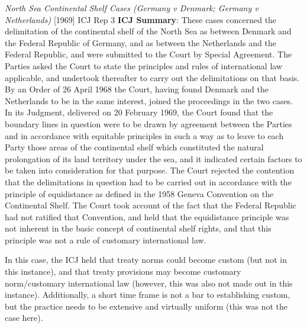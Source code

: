 \begin{casedetails}{\textit{North Sea Continental Shelf Cases (Germany v Denmark; Germany v Netherlands)} [1969] ICJ Rep 3}
    \flushleft
    \textbf{ICJ Summary}: These cases concerned the delimitation of the continental shelf of the North Sea as between Denmark and the Federal Republic of Germany, and as between the Netherlands and the Federal Republic, and were submitted to the Court by Special Agreement. The Parties asked the Court to state the principles and rules of international law applicable, and undertook thereafter to carry out the delimitations on that basis. By an Order of 26 April 1968 the Court, having found Denmark and the Netherlands to be in the same interest, joined the proceedings in the two cases. In its Judgment, delivered on 20 February 1969, the Court found that the boundary lines in question were to be drawn by agreement between the Parties and in accordance with equitable principles in such a way as to leave to each Party those areas of the continental shelf which constituted the natural prolongation of its land territory under the sea, and it indicated certain factors to be taken into consideration for that purpose. The Court rejected the contention that the delimitations in question had to be carried out in accordance with the principle of equidistance as defined in the 1958 Geneva Convention on the Continental Shelf. The Court took account of the fact that the Federal Republic had not ratified that Convention, and held that the equidistance principle was not inherent in the basic concept of continental shelf rights, and that this principle was not a rule of customary international law.

    \tcblower

    \flushleft

    In this case, the ICJ held that treaty norms could become custom (but not in this instance), and that treaty provisions may become customary norm/customary international law (however, this was also not made out in this instance). Additionally, a short time frame is not a bar to establishing custom, but the practice needs to be extensive and virtually uniform (this was not the case here).
\end{casedetails}

